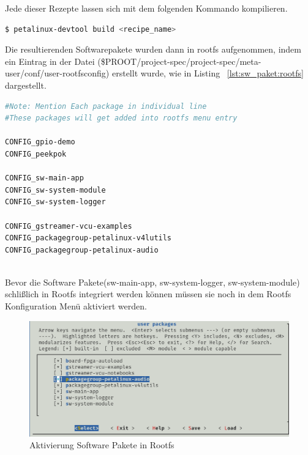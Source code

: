 Jede dieser Rezepte lassen sich mit dem folgenden Kommando kompilieren.
\begin{lstlisting}[language=bash]
	$ petalinux-devtool build <recipe_name>
\end{lstlisting}

Die resultierenden Softwarepakete wurden dann in rootfs aufgenommen, indem ein Eintrag in der Datei (\${PROOT}/project-spec/project-spec/meta-user/conf/user-rootfsconfig) erstellt wurde, wie in Listing ~\ref{lst:sw_paket:rootfs} dargestellt.

\begin{lstlisting}[backgroundcolor = \color{lightgray},basicstyle=\scriptsize\ttfamily,caption={Einbindung Software in Rootfs},label=lst:sw_paket:rootfs,language=bash,framexleftmargin = 2em]
#Note: Mention Each package in individual line
#These packages will get added into rootfs menu entry

CONFIG_gpio-demo
CONFIG_peekpok

CONFIG_sw-main-app
CONFIG_sw-system-module
CONFIG_sw-system-logger

CONFIG_gstreamer-vcu-examples
CONFIG_packagegroup-petalinux-v4lutils
CONFIG_packagegroup-petalinux-audio
	
\end{lstlisting}

Bevor die Software Pakete(sw-main-app, sw-system-logger, sw-system-module) schlißlich in Rootfs integriert werden können müssen sie noch in dem Rootfs Konfiguration Menü aktiviert werden.
\begin{figure}[H]
	\begin{center}		\includegraphics[width=1\textwidth]{./images/rootfs_config_sw.jpg}
	\end{center}
	\vspace{-5pt}
	\caption[Aktivierung Software Pakete in Rootfs]{Aktivierung Software Pakete in Rootfs} %
	\label{fig:rootfs_config:sw}
	\vspace{-5pt}
\end{figure} 

